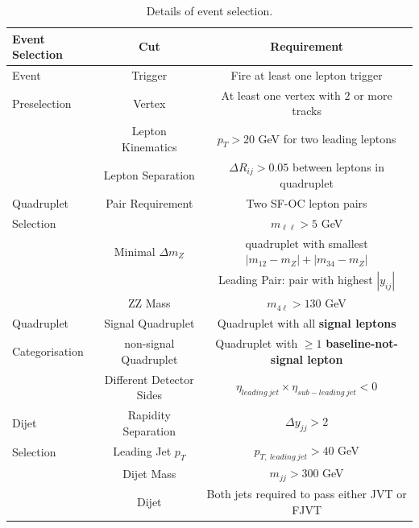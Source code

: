 \begin{table}[!htbp]
    \centering
        \caption{Details of event selection.\label{tab:EventSelection}}
        \begin{tabular}{|| l || c | c ||}
        \hline
        Event Selection         & Cut                   & Requirement                                                       \\
        \hline\hline
        Event               & Trigger                   &  Fire at least one lepton trigger                                     \\
        Preselection                & Vertex                    & At least one vertex with $2$ or more tracks                               \\
        \hline  
                    & Lepton Kinematics         & $p_{T} > 20$ GeV for two leading leptons                     \\
                    & Lepton Separation         & $\Delta R_{ij} > 0.05$ between leptons in quadruplet      \\
        Quadruplet  & Pair Requirement          & Two SF-OC lepton pairs                                            \\
        Selection   &                       & $m_{\ell\ell} > 5$ GeV                                    \\
                    & Minimal $\Delta m_{Z}$    & quadruplet with smallest $|m_{12} - m_{Z} | + |m_{34} - m_{Z} |$\\
                    &                       & Leading Pair: pair with highest $|y_{ij}|$                        \\
                    & ZZ Mass               & $m_{4\ell} > 130 $ GeV                                            \\
        \hline  
        Quadruplet          & Signal Quadruplet         & Quadruplet with all \textbf{signal leptons}                           \\
        Categorisation          & non-signal Quadruplet         & Quadruplet with $\geq 1$ \textbf{baseline-not-signal lepton}          \\
        \hline  
                    & Different Detector Sides      & $\eta_{leading~jet} \times \eta_{sub-leading~jet} < 0 $          \\
        Dijet       & Rapidity Separation       & $ \Delta y_{jj}> 2 $                                              \\
        Selection   & Leading Jet $p_{T}$   &   $p_{T,~leading~jet} > 40$ GeV               \\
                    & Dijet Mass                & $m_{jj} > 300 $ GeV                                                   \\
                    & Dijet         & Both jets required to pass either JVT or FJVT                             \\
        \hline  
                            

\end{tabular}
\end{table}

